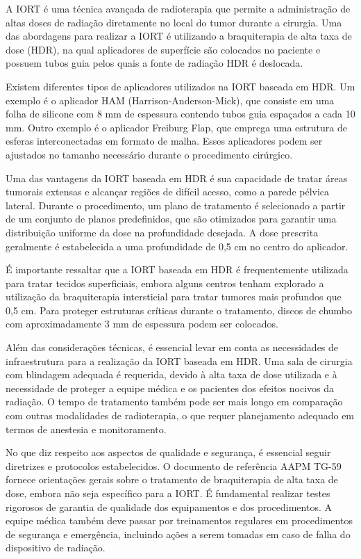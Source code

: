 \documentclass[11pt,a4paper]{article}
\newcounter{exemplo}
\begin{document}
	A IORT é uma técnica avançada de radioterapia que permite a administração de altas doses de radiação diretamente no local do tumor durante a cirurgia. Uma das abordagens para realizar a IORT é utilizando a braquiterapia de alta taxa de dose (HDR), na qual aplicadores de superfície são colocados no paciente e possuem tubos guia pelos quais a fonte de radiação HDR é deslocada.

	Existem diferentes tipos de aplicadores utilizados na IORT baseada em HDR. Um exemplo é o aplicador HAM (Harrison-Anderson-Mick), que consiste em uma folha de silicone com 8 mm de espessura contendo tubos guia espaçados a cada 10 mm. Outro exemplo é o aplicador Freiburg Flap, que emprega uma estrutura de esferas interconectadas em formato de malha. Esses aplicadores podem ser ajustados no tamanho necessário durante o procedimento cirúrgico.

	Uma das vantagens da IORT baseada em HDR é sua capacidade de tratar áreas tumorais extensas e alcançar regiões de difícil acesso, como a parede pélvica lateral. Durante o procedimento, um plano de tratamento é selecionado a partir de um conjunto de planos predefinidos, que são otimizados para garantir uma distribuição uniforme da dose na profundidade desejada. A dose prescrita geralmente é estabelecida a uma profundidade de 0,5 cm no centro do aplicador.

	É importante ressaltar que a IORT baseada em HDR é frequentemente utilizada para tratar tecidos superficiais, embora alguns centros tenham explorado a utilização da braquiterapia intersticial para tratar tumores mais profundos que 0,5 cm. Para proteger estruturas críticas durante o tratamento, discos de chumbo com aproximadamente 3 mm de espessura podem ser colocados.

	Além das considerações técnicas, é essencial levar em conta as necessidades de infraestrutura para a realização da IORT baseada em HDR. Uma sala de cirurgia com blindagem adequada é requerida, devido à alta taxa de dose utilizada e à necessidade de proteger a equipe médica e os pacientes dos efeitos nocivos da radiação. O tempo de tratamento também pode ser mais longo em comparação com outras modalidades de radioterapia, o que requer planejamento adequado em termos de anestesia e monitoramento.

	No que diz respeito aos aspectos de qualidade e segurança, é essencial seguir diretrizes e protocolos estabelecidos. O documento de referência AAPM TG-59 fornece orientações gerais sobre o tratamento de braquiterapia de alta taxa de dose, embora não seja específico para a IORT. É fundamental realizar testes rigorosos de garantia de qualidade dos equipamentos e dos procedimentos. A equipe médica também deve passar por treinamentos regulares em procedimentos de segurança e emergência, incluindo ações a serem tomadas em caso de falha do dispositivo de radiação.
\end{document}
